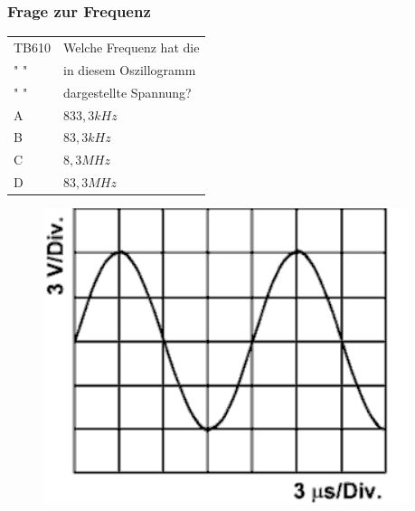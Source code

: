 \begin{frame}
  \frametitle{Frage zur Frequenz}
  \begin{minipage}{0.6\textwidth}
    \begin{tabular}{l||l}\hline
        TB610& Welche Frequenz hat die\\
        " " &  in diesem Oszillogramm\\
        " " & dargestellte Spannung?\\ \hline\hline
         A & $833,3 kHz$ \\ \hline
         B & $83,3kHz$\\ \hline
         C & $8,3MHz$ \\\hline
         D & $83,3MHz$ \\\hline
      \end{tabular}
  \end{minipage}
  \begin{minipage}{0.3\textwidth}
    \begin{figure}
       \includegraphics[width=.9\textwidth]{e02/TB610}{}
     \end{figure}
    \end{minipage}
\end{frame}
